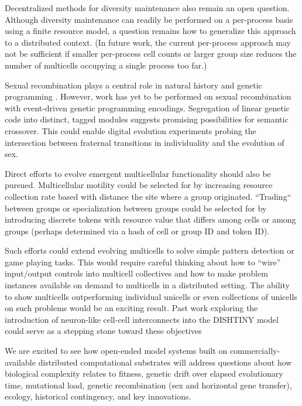 Decentralized methods for diversity maintenance also remain an open question.
Although diversity maintenance can readily be performed on a per-process basis using a finite resource model, a question remains how to generalize this approach to a distributed context.
(In future work, the current per-process approach may not be sufficient if smaller per-process cell counts or larger group size reduces the number of multicells occupying a single process too far.)

Sexual recombination plays a central role in natural history \citep{smith1997major} and genetic programming \citep{o2009riccardo}.
However, work has yet to be performed on sexual recombination with event-driven genetic programming encodings.
Segregation of linear genetic code into distinct, tagged modules suggests promising possibilities for semantic crossover.
This could enable digital evolution experiments probing the intersection between fraternal transitions in individuality and the evolution of sex.

Direct efforts to evolve emergent multicellular functionality should also be pursued.
Multicellular motility could be selected for by increasing resource collection rate based with distance the site where a group originated.
``Trading`` between groups or specialization between groups could be selected for by introducing discrete tokens with resource value that differs among cells or among groups (perhaps determined via a hash of cell or group ID and token ID).

Such efforts could extend evolving multicells to solve simple pattern detection or game playing tasks.
This would require careful thinking about how to ``wire'' input/output controls into multicell collectives and how to make problem instances available on demand to multicells in a distributed setting.
The ability to show multicells outperforming individual unicells or even collections of unicells on such problems would be an exciting result.
Past work exploring the introduction of neuron-like cell-cell interconnects into the DISHTINY model could serve as a stepping stone toward these objectives \citep{moreno2020practical}

We are excited to see how open-ended model systems built on commercially-available distributed computational substrates will address questions about how biological complexity relates to fitness, genetic drift over elapsed evolutionary time, mutational load, genetic recombination (sex and horizontal gene transfer), ecology, historical contingency, and key innovations.
